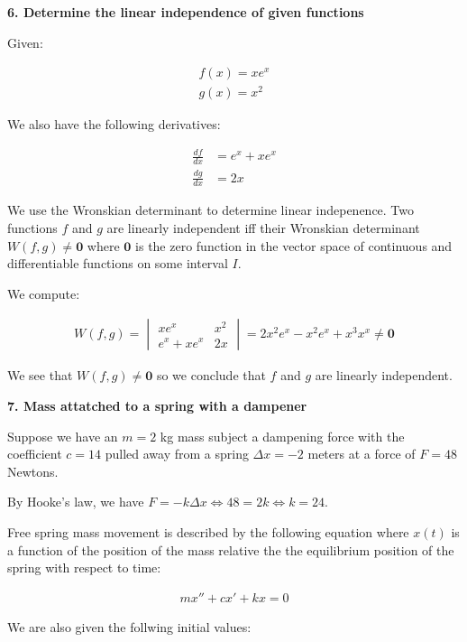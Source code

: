 \documentclass[12pt]{article}
\begin{document}
\pagebreak

\textbf{6. Determine the linear independence of given functions}

Given:

\begin{align}
	f(x) = xe^x \\
	g(x) = x^2
\end{align}

We also have the following derivatives:

\begin{align}
	\frac{df}{dx} & = e^x + xe^x \\
	\frac{dg}{dx} & = 2x
\end{align}

We use the Wronskian determinant to determine linear indepenence.
Two functions $f$ and $g$ are linearly independent
iff their Wronskian determinant $W(f,g) \neq \mathbf{0}$
where $\mathbf{0}$ is the zero function in the vector space
of continuous and differentiable functions on some interval $I$.

We compute:

\begin{align}
	W(f,g) = \begin{vmatrix} xe^x & x^2 \\
	e^x+xe^x & 2x \end{vmatrix} =
	2x^2e^x-x^2e^x+x^3x^x \neq \mathbf{0}
\end{align}

We see that $W(f,g) \neq \mathbf{0}$
so we conclude that $f$ and $g$ are linearly independent.

\pagebreak

\textbf{7. Mass attatched to a spring with a dampener}

Suppose we have an $m = 2$ kg mass subject
a dampening force with the coefficient $c = 14$
pulled away from a spring $ \Delta x = -2$ meters
at a force of $F = 48$ Newtons.

By Hooke's law, we have $F = -k \Delta x \iff 48 = 2k \iff k = 24$.

Free spring mass movement is described by the following equation
where $x(t)$ is a function of the position of the mass
relative the the equilibrium position of the spring
with respect to time:

\begin{align}
	\label{g7.1}
	mx'' + cx' + kx = 0
\end{align}

We are also given the follwing initial values:
\end{document}
